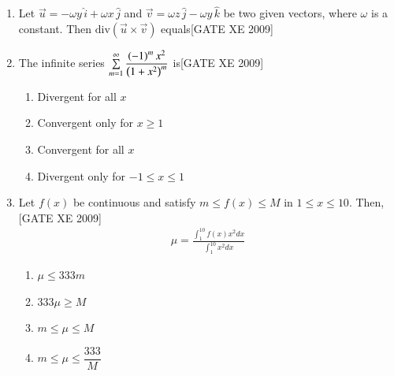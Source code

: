 \documentclass[journal,12pt,onecolumn]{IEEEtran}
\theoremstyle{remark}
\begin{document}
\begin{enumerate}
\item Let $\vec{u} = -\omega y\, \hat{i} + \omega x\, \hat{j}$ and $\vec{v} = \omega z\, \hat{j} - \omega y\, \hat{k}$ be two given vectors, where $\omega$ is a constant. Then $\mathrm{div} (\vec{u} \times \vec{v})$ equals\hfill[GATE XE 2009]
 \begin{enumerate}
\end{enumerate}
\item The infinite series $\sum\limits_{m=1}^\infty \dfrac{\left(-1\right)^m x^2}{\left(1 + x^2\right)^m}$ is\hfill[GATE XE 2009]
    \begin{enumerate}
        \item Divergent for all $x$
        \item Convergent only for $x \geq 1$
        \item Convergent for all $x$
        \item Divergent only for $-1 \leq x \leq 1$
    \end{enumerate}

\item Let $f(x)$ be continuous and satisfy $m \leq f(x) \leq M$ in $1 \leq x \leq 10$. Then,\hfill[GATE XE 2009]
\begin{align*}
    \mu = \frac{\int_1^{10} f(x) x^2 dx}{\int_1^{10} x^2 dx}
\end{align*}
\begin{multicols}{4}
\begin{enumerate}
 
 
      \item   $\mu \leq 333 m$
       \item  $333 \mu \geq M$
       \item $m \leq \mu \leq M$
       \item  $m \leq \mu \leq \dfrac{333}{M}$
        
     \end{enumerate}
  \end{multicols}

   













\end{enumerate}
\end{document}
